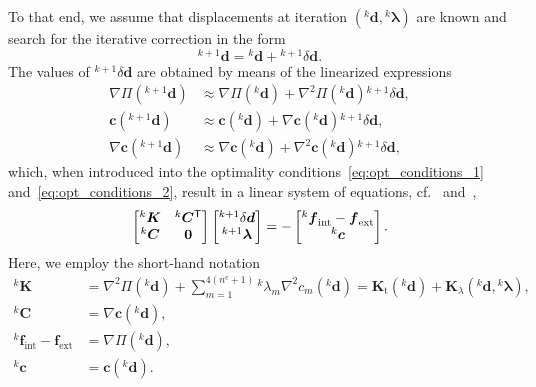 \documentclass[11pt]{article}
\newcommand{\rev}[1]{#1}
\newcommand{\M}[1]{{\boldsymbol #1}}
\newcommand{\lay}[1]{^{(#1)}}
\newcommand{\Etot}{\Pi}
\newcommand{\el}{e}
\newcommand{\numel}{n^\mathrm{\el}}
\newcommand{\trn}{{\sf ^T}}        \newcommand{\eL}[2]{L_{#1}\lay{#2}}
\newcommand{\ite}[1]{{^{#1}}}
\newcommand{\MKt}{\M{K}_\mathrm{t}}
\newcommand{\Mfint}{\M{f}_\mathrm{int}}
\newcommand{\Mfext}{\M{f}_{\mathrm{ext}}}
\newcommand{\Md}{\M{d}}
\begin{document}
To that end, we assume that displacements at iteration $( \ite{k}\Md,
\ite{k}\M{\lambda} )$ are known and search for the iterative correction in the
form
\begin{equation}\label{eq:r_deltar}
\ite{k+1}\Md
=
\ite{k}\Md
+
\ite{k+1}\delta\Md.
\end{equation}
The values of $\ite{k+1}\delta\Md$ are obtained by means of the linearized
expressions
\begin{subequations}
\begin{align}
\nabla\Etot( \ite{k+1}\Md ) 
& \approx 
\nabla\Etot( \ite{k}\Md )
+
\nabla^2 \Etot( \ite{k}\Md)
\ite{k+1}\delta\Md,
\\
\M{c}( \ite{k+1}\Md )
& \approx 
\M{c}( \ite{k}\Md )
+
\nabla \M{c}( \ite{k}\Md )
\ite{k+1}\delta\Md,
\\
\nabla \M{c}( \ite{k+1}\Md )
& \approx 
\nabla \M{c}( \ite{k}\Md )
+
\nabla^2 \M{c}( \ite{k}\Md )
\ite{k+1}\delta\Md,
\end{align}
\end{subequations}
which, when introduced into the optimality
conditions~\eqref{eq:opt_conditions_1} and~\eqref{eq:opt_conditions_2}, result
in a linear system of equations, cf.~\cite{Bonnans:2003:NOTPA}
and~\cite{Zemanova:2008:SNM},
\begin{equation}\label{eq:system}
\begin{bmatrix}
 \ite{k}\M{K} & \ite{k}\M{C}\trn \\
 \ite{k}\M{C} & \M{0}
\end{bmatrix}
\begin{bmatrix}
 \ite{k+1} \delta \Md \\
 \ite{k+1} \M{\lambda}
\end{bmatrix}
=
-
\begin{bmatrix}
 \ite{k}\Mfint - \Mfext \\
 \ite{k}\M{c} 
\end{bmatrix}
.
\end{equation}
Here, we employ the short-hand notation
\begin{subequations}
\begin{align}
\ite{k}\M{K} 
& =  
\nabla^2 \Etot( \ite{k}\Md )
+
\sum_{m=1}^{4(\numel+1)}
\ite{k}\lambda_m
\nabla^2 c_m( \ite{k}\Md )
=
\MKt( \ite{k}\Md ) 
+ 
\M{K}_\lambda( \ite{k}\Md, \ite{k}\M{\lambda}),
\\
\ite{k}\M{C} 
& =  
\nabla\M{c}( \ite{k}\Md ),
\\
\ite{k}\Mfint - \Mfext
& =  
\nabla \Etot( \ite{k}\Md ),
\\
\rev{
\ite{k}\M{c}} & = \rev{\M{c}(\ite{k}\Md).}
\end{align}
\end{subequations}
\end{document}
